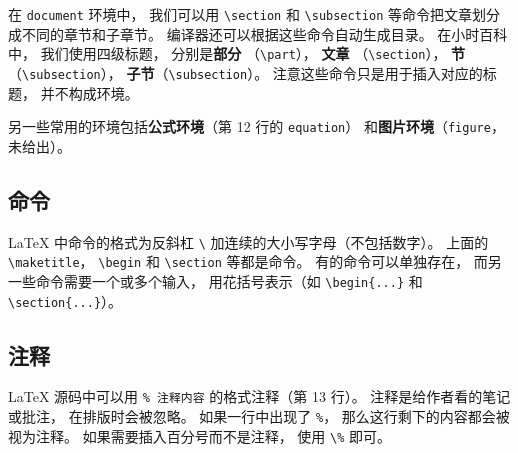 在 \verb`document` 环境中， 我们可以用 \verb`\section` 和 \verb`\subsection` 等命令把文章划分成不同的章节和子章节。 编译器还可以根据这些命令自动生成目录。 在小时百科中， 我们使用四级标题， 分别是\textbf{部分} （\verb`\part`）， \textbf{文章} （\verb`\section`）， \textbf{节}（\verb`\subsection`）， \textbf{子节}（\verb`\subsection`）。 注意这些命令只是用于插入对应的标题， 并不构成环境。

另一些常用的环境包括\textbf{公式环境}（第 12 行的 \verb`equation`） 和\textbf{图片环境}（\verb`figure`， 未给出）。

\subsection{命令}
LaTeX 中命令的格式为反斜杠 \verb`\` 加连续的大小写字母（不包括数字）。 上面的 \verb`\maketitle`， \verb`\begin` 和 \verb`\section` 等都是命令。 有的命令可以单独存在， 而另一些命令需要一个或多个输入， 用花括号表示（如 \verb`\begin{...}` 和 \verb`\section{...}`）。

\subsection{注释}
LaTeX 源码中可以用 \verb`% 注释内容` 的格式注释（第 13 行）。 注释是给作者看的笔记或批注， 在排版时会被忽略。 如果一行中出现了 \verb`%`， 那么这行剩下的内容都会被视为注释。 如果需要插入百分号而不是注释， 使用 \verb`\%` 即可。

